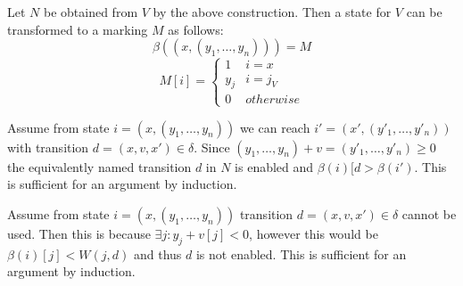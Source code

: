 Let $N$ be obtained from $V$ by the above construction. Then a state for $V$ can be transformed to a marking $M$ as follows:
\[\beta((x,(y_1,\dots,y_n)))=M\]
\[M[i]=
	\begin{cases} 
      1 & i=x\\
      y_j & i=j_V\\
      0 & otherwise
	\end{cases}\]
	
Assume from state $i=(x,(y_1,\dots,y_n))$ we can reach $i'=(x',(y'_1,\dots,y'_n))$ with transition $d=(x,v,x') \in \delta$. Since $(y_1,\dots,y_n)+v=(y'_1,\dots,y'_n) \geq 0$ the equivalently named transition $d$ in $N$ is enabled and $\beta(i)[d>\beta(i')$. This is sufficient for an argument by induction.

Assume from state $i=(x,(y_1,\dots,y_n))$ transition $d=(x,v,x') \in \delta$ cannot be used. Then this is because $\exists j:y_j+v[j]<0$, however this would be $\beta(i)[j]<W(j,d)$ and thus $d$ is not enabled. This is sufficient for an argument by induction.